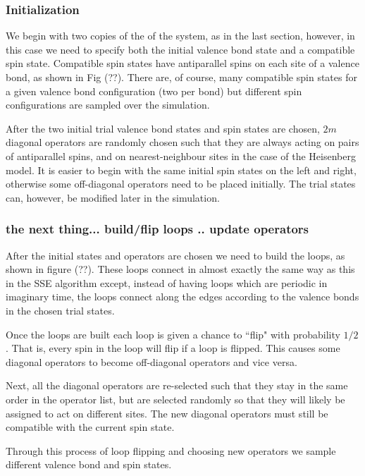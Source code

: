 \documentclass[prb,aps,twocolumn,floatfix,amsmath,amssymb,superscriptaddress,tightenlines]{revtex4}
\begin{document}
\subsubsection{Initialization}
We begin with two copies of the of the system, as in the last section, however, in this case we need to specify both the initial valence bond state and a compatible spin state.
Compatible spin states have antiparallel spins on each site of a valence bond, as shown in Fig (??).  There are, of course, many compatible spin states for a given valence bond configuration (two per bond) but different spin configurations are sampled over the simulation.

After the two initial trial valence bond states and spin states are chosen, $2m$ diagonal operators are randomly chosen such that they are always acting on pairs of antiparallel spins, and on nearest-neighbour sites in the case of the Heisenberg model.
It is easier to begin with the same initial spin states on the left and right, otherwise some off-diagonal operators need to be placed initially.
The trial states can, however, be modified later in the simulation.

\subsubsection{the next thing... build/flip loops .. update operators}

After the initial states and operators are chosen we need to build the loops, as shown in figure (??). 
These loops connect in almost exactly the same way as this in the SSE algorithm except, instead of having loops which are periodic in imaginary time, the loops connect along the edges according to the valence bonds in the chosen trial states.

Once the loops are built each loop is given a chance to ``flip" with probability $1/2$.  That is, every spin in the loop will flip if a loop is flipped.  This causes some diagonal operators to become off-diagonal operators and vice versa.  

Next, all the diagonal operators are re-selected such that they stay in the same order in the operator list, but are selected randomly so that they will likely be assigned to act on different sites.  
The new diagonal operators must still be compatible with the current spin state.

Through this process of loop flipping and choosing new operators we sample different valence bond and spin states.
\end{document}
